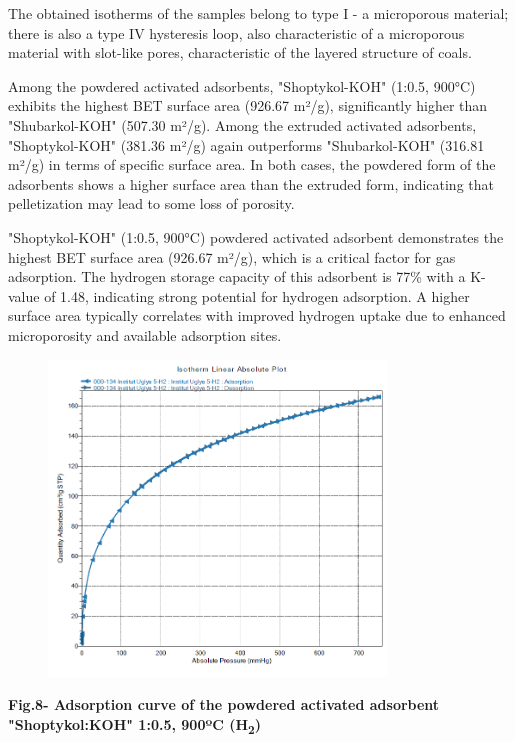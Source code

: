 The obtained isotherms of the samples belong to type I - a microporous
material; there is also a type IV hysteresis loop, also characteristic
of a microporous material with slot-like pores, characteristic of the
layered structure of coals.

Among the powdered activated adsorbents, "Shoptykol-KOH" (1:0.5, 900°C)
exhibits the highest BET surface area (926.67 m²/g), significantly
higher than "Shubarkol-KOH" (507.30 m²/g). Among the extruded activated
adsorbents, "Shoptykol-KOH" (381.36 m²/g) again outperforms
"Shubarkol-KOH" (316.81 m²/g) in terms of specific surface area. In both
cases, the powdered form of the adsorbents shows a higher surface area
than the extruded form, indicating that pelletization may lead to some
loss of porosity.

"Shoptykol-KOH" (1:0.5, 900°C) powdered activated adsorbent demonstrates
the highest BET surface area (926.67 m²/g), which is a critical factor
for gas adsorption. The hydrogen storage capacity of this adsorbent is
77\% with a K-value of 1.48, indicating strong potential for hydrogen
adsorption. A higher surface area typically correlates with improved
hydrogen uptake due to enhanced microporosity and available adsorption
sites.


\begin{figure}[H]
	\centering
	\includegraphics[width=0.8\textwidth]{media/chem2/image26}
	\caption*{}
\end{figure}


{\bfseries Fig.8- Adsorption curve of the powdered activated adsorbent
"Shoptykol:KOH" 1:0.5, 900ºC (H\textsubscript{2})}

